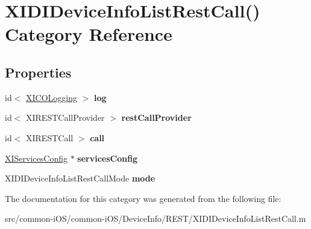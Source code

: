 \hypertarget{category_x_i_d_i_device_info_list_rest_call_07_08}{}\section{X\+I\+D\+I\+Device\+Info\+List\+Rest\+Call() Category Reference}
\label{category_x_i_d_i_device_info_list_rest_call_07_08}
\subsection*{Properties}
\begin{DoxyCompactItemize}
\item 
\hypertarget{category_x_i_d_i_device_info_list_rest_call_07_08_ad96ad51bc0cbaf0fcd5dc2de60e7f90d}{}\label{category_x_i_d_i_device_info_list_rest_call_07_08_ad96ad51bc0cbaf0fcd5dc2de60e7f90d} 
id$<$ \hyperlink{protocol_x_i_c_o_logging-p}{X\+I\+C\+O\+Logging} $>$ {\bfseries log}
\item 
\hypertarget{category_x_i_d_i_device_info_list_rest_call_07_08_a7066fffb883bd484c01de6d115f167d4}{}\label{category_x_i_d_i_device_info_list_rest_call_07_08_a7066fffb883bd484c01de6d115f167d4} 
id$<$ X\+I\+R\+E\+S\+T\+Call\+Provider $>$ {\bfseries rest\+Call\+Provider}
\item 
\hypertarget{category_x_i_d_i_device_info_list_rest_call_07_08_aa92d8c75f1a6060c1ac69398755fb174}{}\label{category_x_i_d_i_device_info_list_rest_call_07_08_aa92d8c75f1a6060c1ac69398755fb174} 
id$<$ X\+I\+R\+E\+S\+T\+Call $>$ {\bfseries call}
\item 
\hypertarget{category_x_i_d_i_device_info_list_rest_call_07_08_af0d37b4d6fb7066e97d8538c36211e8b}{}\label{category_x_i_d_i_device_info_list_rest_call_07_08_af0d37b4d6fb7066e97d8538c36211e8b} 
\hyperlink{interface_x_i_services_config}{X\+I\+Services\+Config} $\ast$ {\bfseries services\+Config}
\item 
\hypertarget{category_x_i_d_i_device_info_list_rest_call_07_08_a39fb4e23cca6c05af682957e20cceb66}{}\label{category_x_i_d_i_device_info_list_rest_call_07_08_a39fb4e23cca6c05af682957e20cceb66} 
X\+I\+D\+I\+Device\+Info\+List\+Rest\+Call\+Mode {\bfseries mode}
\end{DoxyCompactItemize}


The documentation for this category was generated from the following file\+:\begin{DoxyCompactItemize}
\item 
src/common-\/i\+O\+S/common-\/i\+O\+S/\+Device\+Info/\+R\+E\+S\+T/X\+I\+D\+I\+Device\+Info\+List\+Rest\+Call.\+m\end{DoxyCompactItemize}
